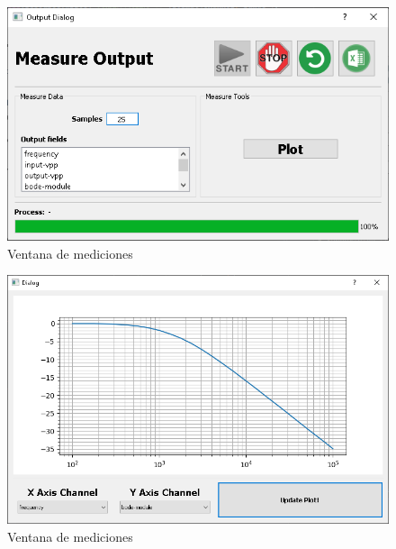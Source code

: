 \begin{figure}[H]
    \centering
        \includegraphics[scale=0.8]{../screenshots/measure_complete.PNG}
    \caption{Ventana de mediciones}
\end{figure}

\begin{figure}[H]
    \centering
        \includegraphics[scale=0.6]{../screenshots/plotter_output.PNG}
    \caption{Ventana de mediciones}
\end{figure}
